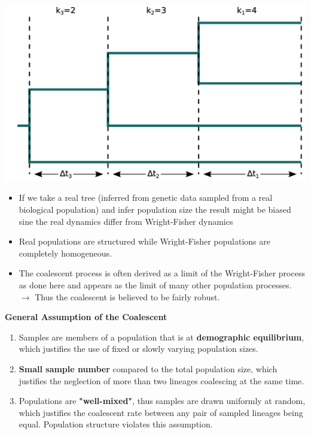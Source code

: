 \documentclass{article}
\begin{document}
\begin{multicols*}{3}
\begin{center}
    \includegraphics[width=1\linewidth, angle=0.0]{coaltree.png}
\end{center}

\begin{itemize}
    \item If we take a real tree (inferred from genetic data sampled from a real biological population) and infer population size the result might be biased sine the real dynamics differ from Wright-Fisher dynamics
    \item Real populations are structured while Wright-Fisher populations are completely homogeneous.
    \item The coalescent process is often derived as a limit of the Wright-Fisher process as done here and appears as the limit of many other population processes. $\rightarrow$ Thus the coalescent is believed to be fairly robust.  
\end{itemize}

\textbf{General Assumption of the Coalescent}

\begin{enumerate}
    \item Samples are members of a population that is at \textbf{demographic equilibrium}, which justifies the use of fixed or slowly varying population sizes. 
    \item \textbf{Small sample number} compared to the total population size, which justifies the neglection of more than two lineages coalescing at the same time. 
    \item Populations are \textbf{"well-mixed"}, thus samples are drawn uniformly at random, which justifies the coalescent rate between any pair of sampled lineages being equal. Population structure violates this assumption.
\end{enumerate}


\end{multicols*}
\end{document}
